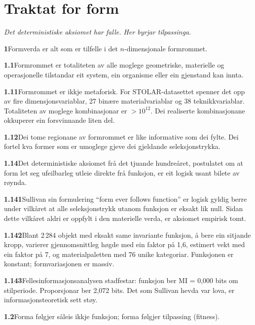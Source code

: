 \documentclass[12pt, a4paper]{article}
\begin{document}
\section{Traktat for form}

\noindent\emph{Det deterministiske aksiomet har falle. Her byrjar tilpassinga.}

\bigskip

\noindent\textbf{1}\quad Formverda er alt som er tilfelle i det $n$-dimensjonale formrommet.

\medskip
\noindent\textbf{1.1}\quad Formrommet er totaliteten av alle moglege geometriske, materielle og operasjonelle tilstandar eit system, ein organisme eller ein gjenstand kan innta.

\medskip
\noindent\textbf{1.11}\quad Formrommet er ikkje metaforisk. For STOLAR-datasettet spenner det opp av fire dimensjonsvariablar, 27 binære materialvariablar og 38 teknikkvariablar. Totaliteten av moglege kombinasjonar er $> 10^{12}$. Dei realiserte kombinasjonane okkuperer ein forsvinnande liten del.

\medskip
\noindent\textbf{1.12}\quad Dei tome regionane av formrommet er like informative som dei fylte. Dei fortel kva former som er umoglege gjeve dei gjeldande seleksjonstrykka.

\medskip
\noindent\textbf{1.14}\quad Det deterministiske aksiomet frå det tjuande hundreåret, postulatet om at form let seg ufeilbarleg utleie direkte frå funksjon, er eit logisk usant bilete av røynda.

\medskip
\noindent\textbf{1.141}\quad Sullivan sin formulering ``form ever follows function'' er logisk gyldig berre under vilkåret at alle seleksjonstrykk utanom funksjon er eksakt lik null. Sidan dette vilkåret aldri er oppfylt i den materielle verda, er aksiomet empirisk tomt.

\medskip
\noindent\textbf{1.142}\quad Blant 2\,284 objekt med eksakt same invariante funksjon, å bere ein sitjande kropp, varierer gjennomsnittleg høgde med ein faktor på 1,6, estimert vekt med ein faktor på 7, og materialpaletten med 76 unike kategoriar. Funksjonen er konstant; formvariasjonen er massiv.

\medskip
\noindent\textbf{1.143}\quad Fellesinformasjonsanalysen stadfestar: funksjon ber MI = 0,000 bits om stilperiode. Proporsjonar ber 2,072 bits. Det som Sullivan hevda var lova, er informasjonsteoretisk sett støy.

\medskip
\noindent\textbf{1.2}\quad Forma følgjer såleis ikkje funksjon; forma følgjer tilpassing (fitness).
\end{document}
